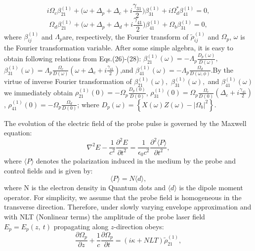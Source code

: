\documentclass[12pt,a4paper]{article}
\begin{document}
\begin{equation}
    i\Omega_c\beta_{21}^{(1)}+
    \big(\omega+\Delta_p+\Delta_c+i\frac{\gamma_{31}}{2}\big)\beta_{31}^{(1)}+i\Omega_d^*\beta_{41}^{(1)}=0,
\end{equation}
\begin{equation}
    \Omega_d\beta_{21}^{(1)}+
    \big(\omega+\Delta_p+\Delta_d+i\frac{\gamma_{41}}{2}\big)\beta_{41}^{(1)}+\Omega_b\beta_{31}^{(1)}=0,
\end{equation}
where $\beta^{(1)}_{ij}$ and $\Lambda_p$are, respectively, the Fourier transform of $\tilde\rho^{(1)}_{ij}$ and $\Omega_p$, $\omega$ is the Fourier transformation variable. After some simple algebra, it is easy to obtain following relations from Eqs.(26)-(28): $\beta^{(1)}_{21}(\omega)=-\Lambda_p{\frac{D_p(\omega)}{D(\omega)}},$ $\beta^{(1)}_{31}(\omega)=\Lambda_p\frac{\Omega_c}{D(\omega)}(\omega+\Delta_c+i\frac{\gamma_{41}}{2})$,and $\beta^{(1)}_{41}(\omega)=-\Lambda_p{\frac{\Omega_{d}}{D(\omega,\phi)}}$.By the virtue of inverse Fourier transformation of $\beta^{(1)}_{21}(\omega),$ $\beta^{(1)}_{31}(\omega),$ and $\beta^{(1)}_{41}(\omega)$ we immediately obtain ${\rho^{(1)}_{21}(0)}=-\Omega_p{\frac{D_p(0)}{D{(0)}}}$, ${\rho^{(1)}_{31}(0)}=\Omega_p\frac{\Omega_c}{D{(0)}}(\Delta_c+i\frac{\gamma_{41}}{2})$, ${\rho^{(1)}_{41}(0)}=-\Omega_p{\frac{\Omega_{d}}{D{(0)}}}$; where $D_p{(\omega)} = \left\lbrace X{(\omega)}Z{(\omega)}-{\vert{\Omega_b}\vert}^{2}\right\rbrace$.\par
The evolution of the electric field of the probe pulse is governed by the Maxwell
equation:
\begin{equation}
    \nabla^2E-\frac{1}{c^2}\frac{\partial^2E}{\partial t^2}=\frac{1}{\epsilon_0c^2}\frac{\partial^2\langle P\rangle}{\partial t^2},
\end{equation}
where \(\langle P\rangle\) denotes the polarization induced in the medium by the probe and control fields and is given by:
\begin{equation}
    \langle P\rangle=N\langle d\rangle,
\end{equation}
where N is the electron density in Quantum dots and \(\langle d\rangle\) is the dipole moment operator. For simplicity, we assume that the probe field is homogeneous in the transverse direction. Therefore, under slowly varying envelope approximation and with NLT (Nonlinear terms) the amplitude of the probe laser field \(E_p=E_p(z,\ t)\) propagating along \(z\)-direction obeys:
\begin{equation}
    \frac{\partial\Omega_p}{\partial z}+\frac{1}{c}\frac{\partial\Omega_p}{\partial t}=(i\kappa+NLT)\tilde\rho_{21}^{(1)},
\end{equation}
\end{document}
